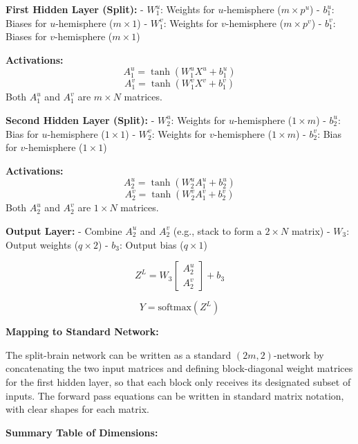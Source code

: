 \documentclass[
]{article}
\begin{document}
\textbf{First Hidden Layer (Split):} - \(W^u_1\): Weights for
\(u\)-hemisphere (\(m \times p^u\)) - \(b^u_1\): Biases for
\(u\)-hemisphere (\(m \times 1\)) - \(W^v_1\): Weights for
\(v\)-hemisphere (\(m \times p^v\)) - \(b^v_1\): Biases for
\(v\)-hemisphere (\(m \times 1\))

\textbf{Activations:} \[
A^u_1 = \tanh(W^u_1 X^u + b^u_1)
\] \[
A^v_1 = \tanh(W^v_1 X^v + b^v_1)
\] Both \(A^u_1\) and \(A^v_1\) are \(m \times N\) matrices.

\textbf{Second Hidden Layer (Split):} - \(W^u_2\): Weights for
\(u\)-hemisphere (\(1 \times m\)) - \(b^u_2\): Bias for \(u\)-hemisphere
(\(1 \times 1\)) - \(W^v_2\): Weights for \(v\)-hemisphere
(\(1 \times m\)) - \(b^v_2\): Bias for \(v\)-hemisphere (\(1 \times 1\))

\textbf{Activations:} \[
A^u_2 = \tanh(W^u_2 A^u_1 + b^u_2)
\] \[
A^v_2 = \tanh(W^v_2 A^v_1 + b^v_2)
\] Both \(A^u_2\) and \(A^v_2\) are \(1 \times N\) matrices.

\textbf{Output Layer:} - Combine \(A^u_2\) and \(A^v_2\) (e.g., stack to
form a \(2 \times N\) matrix) - \(W_3\): Output weights (\(q \times 2\))
- \(b_3\): Output bias (\(q \times 1\))

\[Z^L = W_3 \begin{bmatrix} A^u_2 \\ A^v_2 \end{bmatrix} + b_3\]

\[Y = \text{softmax}(Z^L)\]

\textbf{Mapping to Standard Network:}

The split-brain network can be written as a standard \((2m, 2)\)-network
by concatenating the two input matrices and defining block-diagonal
weight matrices for the first hidden layer, so that each block only
receives its designated subset of inputs. The forward pass equations can
be written in standard matrix notation, with clear shapes for each
matrix.

\textbf{Summary Table of Dimensions:}
\end{document}
